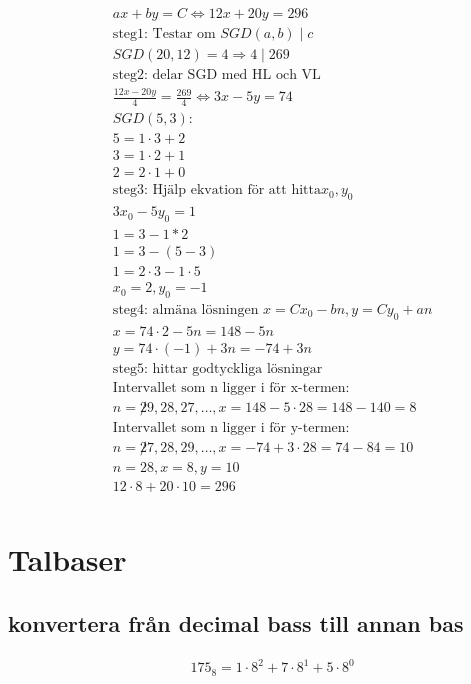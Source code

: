 \documentclass{article}
\begin{document}
\begin{align*}
  &\quad  ax + by = C \Leftrightarrow 12x + 20y = 296 \\
  &\quad  \text{steg1: Testar om } SGD(a,b) \mid c \\
  &\quad  SGD(20,12) = 4 \Rightarrow 4 \mid 269 \\
  &\quad  \text{steg2: delar SGD med HL och VL} \\
  &\quad  \frac{12x - 20y}{4} = \frac{269}{4} \Leftrightarrow 3x - 5y = 74 \\
  &\quad  SGD(5,3): \\
  &\quad  5 = 1 \cdot 3 + 2 \\
  &\quad  3 = 1 \cdot 2 + 1 \\
  &\quad  2 = 2 \cdot 1 + 0 \\
  &\quad  \text{steg3: Hjälp ekvation för att hitta} x_0, y_0 \\
  &\quad  3x_0 - 5y_0 = 1 \\
  &\quad  1 = 3 - 1 * 2 \\
  &\quad  1 = 3 - (5 - 3) \\
  &\quad  1 = 2 \cdot 3 - 1 \cdot 5 \\
  &\quad  x_0 = 2, y_0 = -1 \\
  &\quad  \text{steg4: almäna lösningen } x = Cx_0 - bn, y = Cy_0 + an \\
  &\quad  x = 74 \cdot 2 - 5n = 148 - 5n \\
  &\quad  y = 74 \cdot (-1) + 3n = -74 + 3n \\
  &\quad  \text{steg5: hittar godtyckliga lösningar} \\
  &\quad  \text{Intervallet som n ligger i för x-termen:} \\
  &\quad  n = {\not 29, 28, 27, \ldots }, x = 148 - 5 \cdot 28 = 148 - 140 = 8 \\ 
  &\quad  \text{Intervallet som n ligger i för y-termen:} \\
  &\quad  n = {\not 27, 28, 29, \ldots }, x = -74 + 3 \cdot 28 = 74 - 84 = 10 \\
  &\quad  n = 28, x=8, y=10 \\
  &\quad  12 \cdot 8 + 20 \cdot 10 = 296 \\
\end{align*}


\newpage

\section{Talbaser}
\subsection{konvertera från decimal bass till annan bas}
\begin{align*}
  &\quad  175_8 = 1 \cdot 8^2 + 7 \cdot 8^1 + 5 \cdot 8^0 \\
\end{align*}
\end{document}
